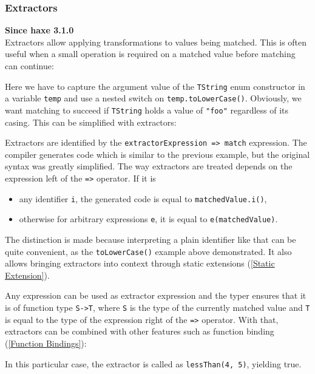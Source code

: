 \documentclass{article}
\newcommand{\type}[1]{\texttt{#1}}
\newcommand{\expr}[1]{\texttt{#1}}
\newcommand{\tref}[2]{#1 (\ref{#2})}
\newcommand{\since}[1]{\noindent\textbf{Since haxe #1}\\}
\begin{document}
\subsubsection{Extractors}
\since{3.1.0}

Extractors allow applying transformations to values being matched. This is often useful when a small operation is required on a matched value before matching can continue:



Here we have to capture the argument value of the \expr{TString} enum constructor in a variable \expr{temp} and use a nested switch on \expr{temp.toLowerCase()}. Obviously, we want matching to succeed if \expr{TString} holds a value of \expr{"foo"} regardless of its casing. This can be simplified with extractors:



Extractors are identified by the \expr{extractorExpression => match} expression. The compiler generates code which is similar to the previous example, but the original syntax was greatly simplified. The way extractors are treated depends on the expression left of the \expr{=>} operator. If it is

\begin{itemize}
	\item any identifier \expr{i}, the generated code is equal to \expr{matchedValue.i()},
	\item otherwise for arbitrary expressions \expr{e}, it is equal to \expr{e(matchedValue)}.
\end{itemize}

The distinction is made because interpreting a plain identifier like that can be quite convenient, as the \expr{toLowerCase()} example above demonstrated. It also allows bringing extractors into context through \tref{static extensions}{Static Extension}.

Any expression can be used as extractor expression and the typer ensures that it is of function type \type{S->T}, where \type{S} is the type of the currently matched value and \type{T} is equal to the type of the expression right of the \expr{=>} operator. With that, extractors can be combined with other features such as \tref{function binding}{Function Bindings}:



In this particular case, the extractor is called as \expr{lessThan(4, 5)}, yielding true.
\end{document}

